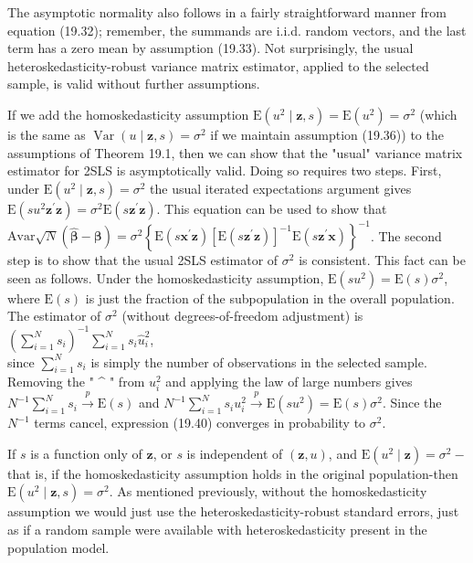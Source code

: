 \documentclass[10pt]{article}
\begin{document}
The asymptotic normality also follows in a fairly straightforward manner from equation (19.32); remember, the summands are i.i.d. random vectors, and the last term has a zero mean by assumption (19.33). Not surprisingly, the usual heteroskedasticity-robust variance matrix estimator, applied to the selected sample, is valid without further assumptions.

If we add the homoskedasticity assumption $\mathrm{E}\left(u^{2} \mid \mathbf{z}, s\right)=\mathrm{E}\left(u^{2}\right)=\sigma^{2}$ (which is the same as $\operatorname{Var}(u \mid \mathbf{z}, s)=\sigma^{2}$ if we maintain assumption (19.36)) to the assumptions of Theorem 19.1, then we can show that the "usual" variance matrix estimator for 2SLS is asymptotically valid. Doing so requires two steps. First, under $\mathrm{E}\left(u^{2} \mid \mathbf{z}, s\right)=\sigma^{2}$ the usual iterated expectations argument gives $\mathrm{E}\left(s u^{2} \mathbf{z}^{\prime} \mathbf{z}\right)=\sigma^{2} \mathrm{E}\left(s \mathbf{z}^{\prime} \mathbf{z}\right)$. This equation can be used to show that $\mathrm{Avar} \sqrt{N}(\hat{\boldsymbol{\beta}}-\boldsymbol{\beta})=\sigma^{2}\left\{\mathrm{E}\left(s \mathbf{x}^{\prime} \mathbf{z}\right)\left[\mathrm{E}\left(s \mathbf{z}^{\prime} \mathbf{z}\right)\right]^{-1} \mathrm{E}\left(s \mathbf{z}^{\prime} \mathbf{x}\right)\right\}^{-1}$. The second step is to show that the usual 2SLS estimator of $\sigma^{2}$ is consistent. This fact can be seen as follows. Under the homoskedasticity assumption, $\mathrm{E}\left(s u^{2}\right)=\mathrm{E}(s) \sigma^{2}$, where $\mathrm{E}(s)$ is just the fraction of the subpopulation in the overall population. The estimator of $\sigma^{2}$ (without degrees-of-freedom adjustment) is\\
$\left(\sum_{i=1}^{N} s_{i}\right)^{-1} \sum_{i=1}^{N} s_{i} \hat{u}_{i}^{2}$,\\
since $\sum_{i=1}^{N} s_{i}$ is simply the number of observations in the selected sample. Removing the " \^{} " from $u_{i}^{2}$ and applying the law of large numbers gives $N^{-1} \sum_{i=1}^{N} s_{i} \xrightarrow{p} \mathrm{E}(s)$ and $N^{-1} \sum_{i=1}^{N} s_{i} u_{i}^{2} \xrightarrow{p} \mathrm{E}\left(s u^{2}\right)=\mathrm{E}(s) \sigma^{2}$. Since the $N^{-1}$ terms cancel, expression (19.40) converges in probability to $\sigma^{2}$.

If $s$ is a function only of $\mathbf{z}$, or $s$ is independent of $(\mathbf{z}, u)$, and $\mathrm{E}\left(u^{2} \mid \mathbf{z}\right)=\sigma^{2}-$ that is, if the homoskedasticity assumption holds in the original population-then $\mathrm{E}\left(u^{2} \mid \mathbf{z}, s\right)=\sigma^{2}$. As mentioned previously, without the homoskedasticity assumption we would just use the heteroskedasticity-robust standard errors, just as if a random sample were available with heteroskedasticity present in the population model.
\end{document}
